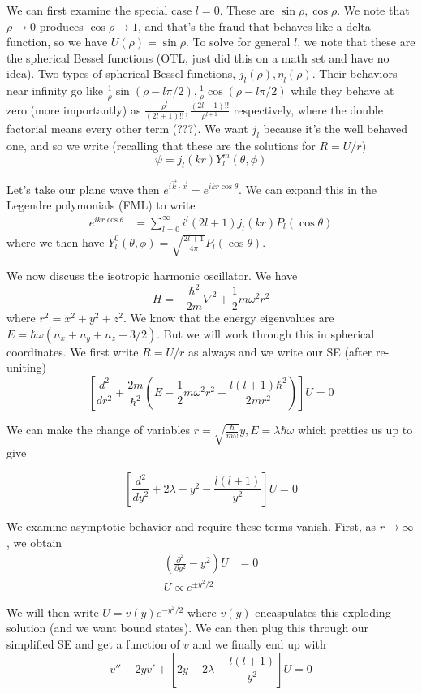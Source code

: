 \documentclass[10pt]{report}
\newcommand{\rtd}[2]{\frac{d^2#1}{d#2^2}}
\newcommand{\ptd}[2]{\frac{\partial^2 #1}{\partial#2^2}}
\begin{document}
We can first examine the special case $l=0$. These are $\sin \rho, \cos \rho$. We note that $\rho \to 0$ produces $\cos \rho \to 1$, and that's the fraud that behaves like a delta function, so we have $U(\rho) = \sin \rho$. To solve for general $l$, we note that these are the spherical Bessel functions (OTL, just did this on a math set and have no idea). Two types of spherical Bessel functions, $j_l(\rho), \eta_l(\rho)$. Their behaviors near infinity go like $\frac{1}{\rho}\sin(\rho - l\pi/2), \frac{1}{\rho}\cos (\rho - l\pi/2)$ while they behave at zero (more importantly) as $\frac{\rho^l}{(2l+1)!!}, \frac{(2l-1)!!}{\rho^{l+1}}$ respectively, where the double factorial means every other term (???). We want $j_l$ because it's the well behaved one, and so we write (recalling that these are the solutions for $R = U/r$)
$$\psi = j_l(kr) Y_l^m(\theta,\phi)$$

Let's take our plane wave then $e^{i\vec{k}\cdot \vec{x}} = e^{ikr\cos \theta}$. We can expand this in the Legendre polymonials (FML) to write
\begin{align}
    e^{ikr\cos \theta} &= \sum_{l=0}^\infty i^{l}(2l+1)j_l(kr)P_l(\cos \theta)
\end{align}
where we then have $Y_l^0(\theta,\phi) = \sqrt{\frac{2l+1}{4\pi}} P_l(\cos \theta)$. 

We now discuss the isotropic harmonic oscillator. We have
$$H = -\frac{\hbar^2}{2m} \nabla^2 + \frac{1}{2}m\omega^2 r^2$$
where $r^2 = x^2 + y^2 + z^2$. We know that the energy eigenvalues are $E = \hbar\omega (n_x + n_y + n_z + 3/2)$. But we will work through this in spherical coordinates. We first write $R = U/r$ as always and we write our SE (after re-uniting)
$$\left[\rtd{}{r} + \frac{2m}{\hbar^2}\left( E - \frac{1}{2}m\omega^2 r^2 - \frac{l(l+1)\hbar^2}{2mr^2} \right)\right] U= 0$$

We can make the change of variables $r = \sqrt{\frac{\hbar}{m\omega}}y, E = \lambda \hbar \omega$ which pretties us up to give

$$\left[\rtd{}{y} + 2\lambda - y^2 - \frac{l(l+1)}{y^2}\right]U = 0$$

We examine asymptotic behavior and require these terms vanish. First, as $r \to \infty$, we obtain 
\begin{align}
    \left(\ptd{}{y} - y^2\right) U &= 0\\
    U \propto e^{\pm y^2/2}
\end{align}

We will then write $U = v(y)e^{-y^2/2}$ where $v(y)$ encaspulates this exploding solution (and we want bound states). We can then plug this through our simplified SE and get a function of $v$ and we finally end up with
$$v'' - 2yv' + \left[ 2y -2\lambda -\frac{l(l+1)}{y^2} \right]U = 0$$
\end{document}
